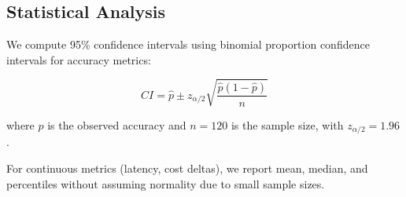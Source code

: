 \subsection{Statistical Analysis}

We compute 95\% confidence intervals using binomial proportion confidence intervals for accuracy metrics:

\begin{equation}
CI = \hat{p} \pm z_{\alpha/2}\sqrt{\frac{\hat{p}(1-\hat{p})}{n}}
\end{equation}

where $\hat{p}$ is the observed accuracy and $n=120$ is the sample size, with $z_{\alpha/2} = 1.96$.

For continuous metrics (latency, cost deltas), we report mean, median, and percentiles without assuming normality due to small sample sizes.
